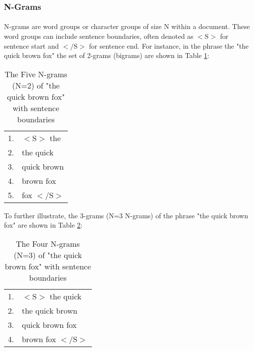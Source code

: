 	\subsubsection {N-Grams}
		\paragraph{} N-grams are word groups or character groups of size N within a document.  These word groups can include sentence boundaries, often denoted as $<\text{S}>$ for sentence start and $<\text{/S}>$ for sentence end. For instance, in the phrase the "the quick brown fox" the set of 2-grams (bigrams) are shown in Table \ref{table:2grams}:
		\begin{center}
			\begin{table}[h]
				\begin{center}
					\begin{tabular}{ r l}
					1. & $<\text{S}>$ the\\
					2. & the quick\\
					3. & quick brown\\
					4. & brown fox\\
					5. & fox $<\text{/S}>$\\
					\end{tabular}
					\caption{The Five N-grams (N=2) of "the quick brown fox" with sentence boundaries}
					\label{table:2grams}
				\end{center}
			\end{table}
		\end{center}
		
		To further illustrate, the 3-grams (N=3 N-grams) of the phrase "the quick brown fox" are shown in Table \ref{table:3grams}:
		
		\begin{center}
			\begin{table}[h]
			
			
				\begin{center}
					\begin{tabular}{ r l }
					1. & $<\text{S}>$ the quick\\
					2. & the quick brown \\
					3. & quick brown fox\\
					4. & brown fox $<\text{/S}>$\\
					\end{tabular}
					\caption{The Four N-grams (N=3) of "the quick brown fox" with sentence boundaries}
					\label{table:3grams}
				\end{center}
			\end{table}
		\end{center}
		
